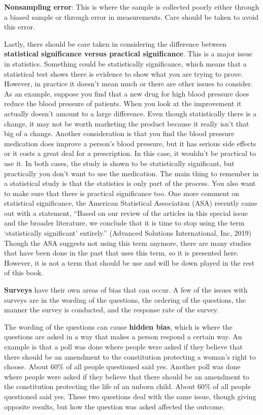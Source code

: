 \documentclass[]{book}
\begin{document}
\textbf{Nonsampling error}: This is where the sample is collected poorly either through a biased sample or through error in measurements. Care should be taken to avoid this error.

Lastly, there should be care taken in considering the difference between \textbf{statistical significance versus practical significance}. This is a major issue in statistics. Something could be statistically significance, which means that a statistical test shows there is evidence to show what you are trying to prove. However, in practice it doesn't mean much or there are other issues to consider. As an example, suppose you find that a new drug for high blood pressure does reduce the blood pressure of patients. When you look at the improvement it actually doesn't amount to a large difference. Even though statistically there is a change, it may not be worth marketing the product because it really isn't that big of a change. Another consideration is that you find the blood pressure medication does improve a person's blood pressure, but it has serious side effects or it costs a great deal for a prescription. In this case, it wouldn't be practical to use it. In both cases, the study is shown to be statistically significant, but practically you don't want to use the medication. The main thing to remember in a statistical study is that the statistics is only part of the process. You also want to make sure that there is practical significance too. One more comment on statistical significance, the American Statistical Association (ASA) recently came out with a statement, ``Based on our review of the articles in this special issue and the broader literature, we conclude that it is time to stop using the term `statistically significant' entirely.'' (Advanced Solutions International, Inc, 2019) Though the ASA suggests not using this term anymore, there are many studies that have been done in the past that uses this term, so it is presented here. However, it is not a term that should be use and will be down played in the rest of this book.

\textbf{Surveys} have their own areas of bias that can occur. A few of the issues with surveys are in the wording of the questions, the ordering of the questions, the manner the survey is conducted, and the response rate of the survey.

The wording of the questions can cause \textbf{hidden bias}, which is where the questions are asked in a way that makes a person respond a certain way. An example is that a poll was done where people were asked if they believe that there should be an amendment to the constitution protecting a woman's right to choose. About 60\% of all people questioned said yes. Another poll was done where people were asked if they believe that there should be an amendment to the constitution protecting the life of an
unborn child. About 60\% of all people questioned said yes. These two questions deal with the same issue, though giving opposite results, but how the question was asked affected the outcome.
\end{document}
